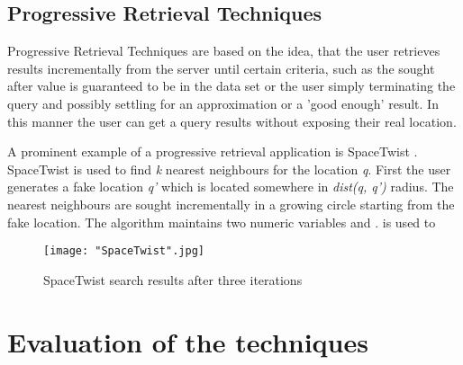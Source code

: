 \documentclass[english]{tktltiki2}
\theoremstyle{definition}
\theoremstyle{remark}
\begin{document}
\subsection{Progressive Retrieval Techniques}

Progressive Retrieval Techniques are based on the idea, that the user retrieves results incrementally from the server until certain criteria, such as the sought after value is guaranteed to be in the data set or the user simply terminating the query and possibly settling for an approximation or a 'good enough' result. In this manner the user can get a query results without exposing their real location. \par

A prominent example of a progressive retrieval application is SpaceTwist \cite{SpaceTwist}. SpaceTwist is used to find \textit{k} nearest neighbours for the location \textit{q}. First the user generates a fake location \textit{q'} which is located somewhere in \textit{dist(q, q')} radius. The nearest neighbours are sought incrementally in a growing circle starting from the fake location. The algorithm maintains two numeric variables \textgamma \hspace{1mm}  and \texttau. \textgamma is used to

\begin{figure}[ht!]
\centering
{}
\texttt{[image: "SpaceTwist".jpg]}
\caption{SpaceTwist search results after three iterations}
\label{fig:SpaceTwist}
\end{figure} 

\section{Evaluation of the techniques}


%
%
% 
%







% 
\end{document}
